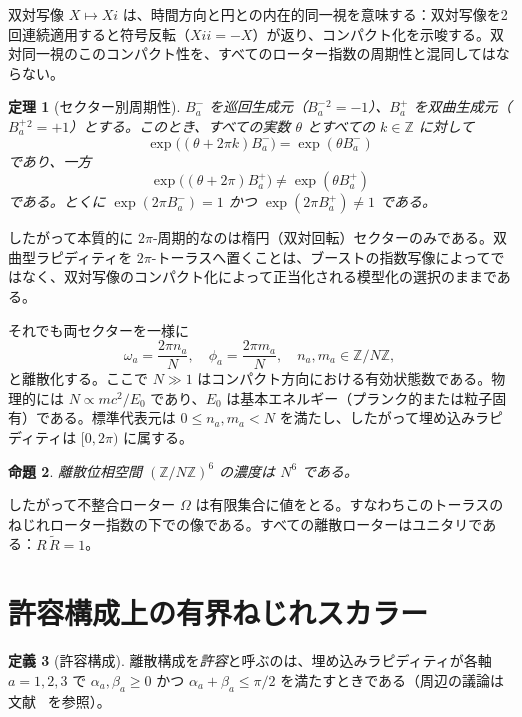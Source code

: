 \documentclass[a4paper]{article}
\newtheorem{theorem}{定理}[section]
\newtheorem{proposition}[theorem]{命題}
\theoremstyle{definition}
\newtheorem{definition}[theorem]{定義}
\begin{document}
双対写像 $X \mapsto Xi$ は、時間方向と円との内在的同一視を意味する：双対写像を2回連続適用すると符号反転（$Xi i = -X$）が返り、コンパクト化を示唆する。双対同一視のこのコンパクト性を、すべてのローター指数の周期性と混同してはならない。

\begin{theorem}[セクター別周期性]
\label{thm:periodicity}
$B^-_a$ を巡回生成元（$B^-_a{}^2=-1$）、$B^+_a$ を双曲生成元（$B^+_a{}^2=+1$）とする。このとき、すべての実数 $\theta$ とすべての $k\in\mathbb{Z}$ に対して
\[
\exp\bigl((\theta+2\pi k)B^-_a\bigr)=\exp(\theta B^-_a)
\]
であり、一方
\[
\exp\bigl((\theta+2\pi)B^+_a\bigr)\neq\exp(\theta B^+_a)
\]
である。とくに $\exp(2\pi B^-_a)=1$ かつ $\exp(2\pi B^+_a)\neq 1$ である。
\end{theorem}

したがって本質的に $2\pi$-周期的なのは楕円（双対回転）セクターのみである。双曲型ラピディティを $2\pi$-トーラスへ置くことは、ブーストの指数写像によってではなく、双対写像のコンパクト化によって正当化される模型化の選択のままである。

それでも両セクターを一様に
\[
\omega_a = \frac{2\pi n_a}{N}, \quad \phi_a = \frac{2\pi m_a}{N}, \quad n_a, m_a \in \mathbb{Z}/N\mathbb{Z},
\]
と離散化する。ここで $N \gg 1$ はコンパクト方向における有効状態数である。物理的には $N \propto m c^2 / E_0$ であり、$E_0$ は基本エネルギー（プランク的または粒子固有）である。標準代表元は $0\leq n_a,m_a<N$ を満たし、したがって埋め込みラピディティは $[0,2\pi)$ に属する。

\begin{proposition}
\label{prop:torus-card}
離散位相空間 $(\mathbb{Z}/N\mathbb{Z})^6$ の濃度は $N^6$ である。
\end{proposition}

したがって不整合ローター $\Omega$ は有限集合に値をとる。すなわちこのトーラスのねじれローター指数の下での像である。すべての離散ローターはユニタリである：$R\,\widetilde{R}=1$。

\section{許容構成上の有界ねじれスカラー}
\label{sec:bounded}

\begin{definition}[許容構成]
\label{def:admissible}
離散構成を\emph{許容}と呼ぶのは、埋め込みラピディティが各軸 $a=1,2,3$ で $\alpha_a,\beta_a\geq 0$ かつ $\alpha_a+\beta_a\leq\pi/2$ を満たすときである（周辺の議論は文献~\cite{diophantine-paper} を参照）。
\end{definition}
\end{document}

